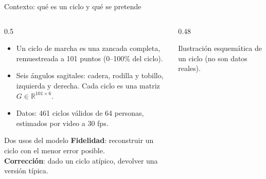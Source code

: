 \documentclass[aspectratio=169,10pt,t]{beamer}
\newcommand{\gr}{$^\circ$}
\begin{document}
\begin{frame}{Contexto: qué es un ciclo y qué se pretende}
\begin{columns}[T]
\begin{column}{0.5\textwidth}
\begin{itemize}\setlength{\itemsep}{4pt}
\item Un \alert{ciclo de marcha} es una zancada completa, remuestreada a 101 puntos (0--100\% del ciclo).
\item Seis ángulos sagitales: cadera, rodilla y tobillo, izquierda y derecha. Cada ciclo es una matriz $G\in\mathbb{R}^{101\times 6}$.
\item Datos: 461 ciclos válidos de 64 personas, estimados por video a 30 fps.
\end{itemize}
\vspace{4pt}
\begin{block}{Dos usos del modelo}
\textbf{Fidelidad}: reconstruir un ciclo con el menor error posible.\\
\textbf{Corrección}: dado un ciclo atípico, devolver una versión típica.
\end{block}
\end{column}
\begin{column}{0.48\textwidth}
\centering
{}

{\scriptsize Ilustración esquemática de un ciclo (no son datos reales).}
\end{column}
\end{columns}
\end{frame}
\end{document}
